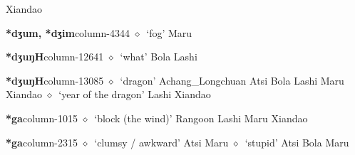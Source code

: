          Xiandao 
  \item {\footnotesize \textbf{*dʒum, *dʒim}}{\tiny column-4344}
         $\diamond$~`fog'
         Maru 
  \item {\footnotesize \textbf{*dʒuŋH}}{\tiny column-12641}
         $\diamond$~`what'
         Bola 
\hspace{1ex}
         Lashi 
  \item {\footnotesize \textbf{*dʒuŋH}}{\tiny column-13085}
         $\diamond$~`dragon'
         Achang\_Longchuan 
\hspace{1ex}
         Atsi 
\hspace{1ex}
         Bola 
\hspace{1ex}
         Lashi 
\hspace{1ex}
         Maru 
\hspace{1ex}
         Xiandao 
\hspace{1ex}
         $\diamond$~`year of the dragon'
         Lashi 
\hspace{1ex}
         Xiandao 
  \item {\footnotesize \textbf{*ga}}{\tiny column-1015}
         $\diamond$~`block (the wind)'
         Rangoon 
\hspace{1ex}
         Lashi 
\hspace{1ex}
         Maru 
\hspace{1ex}
         Xiandao 
  \item {\footnotesize \textbf{*ga}}{\tiny column-2315}
         $\diamond$~`clumsy / awkward'
         Atsi 
\hspace{1ex}
         Maru 
\hspace{1ex}
         $\diamond$~`stupid'
         Atsi 
\hspace{1ex}
         Bola 
\hspace{1ex}
         Maru 
